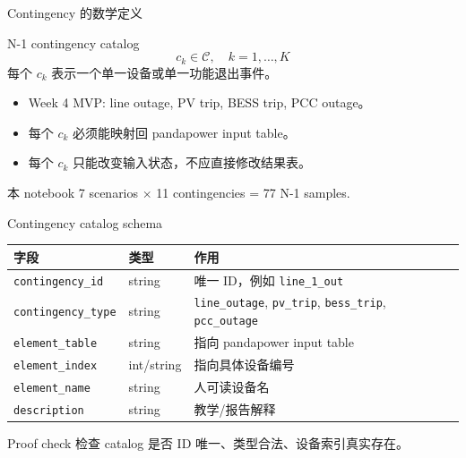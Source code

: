 \documentclass[aspectratio=169,11pt]{beamer}
\begin{document}
\begin{frame}{Contingency 的数学定义}
\begin{block}{N-1 contingency catalog}
\[
c_k \in \mathcal{C},\quad k=1,\ldots,K
\]
每个 $c_k$ 表示一个单一设备或单一功能退出事件。
\end{block}
\begin{itemize}
  \item Week 4 MVP: line outage, PV trip, BESS trip, PCC outage。
  \item 每个 $c_k$ 必须能映射回 pandapower input table。
  \item 每个 $c_k$ 只能改变输入状态，不应直接修改结果表。
\end{itemize}
\begin{exampleblock}{本 notebook}
7 scenarios $\times$ 11 contingencies = 77 N-1 samples.
\end{exampleblock}
\end{frame}

\begin{frame}{Contingency catalog schema}
\scriptsize
\begin{tabular}{llp{6.2cm}}
\toprule
字段 & 类型 & 作用 \\
\midrule
\texttt{contingency\_id} & string & 唯一 ID，例如 \texttt{line\_1\_out} \\
\texttt{contingency\_type} & string & \texttt{line\_outage}, \texttt{pv\_trip}, \texttt{bess\_trip}, \texttt{pcc\_outage} \\
\texttt{element\_table} & string & 指向 pandapower input table \\
\texttt{element\_index} & int/string & 指向具体设备编号 \\
\texttt{element\_name} & string & 人可读设备名 \\
\texttt{description} & string & 教学/报告解释 \\
\bottomrule
\end{tabular}
\vspace{0.3cm}

\begin{block}{Proof check}
检查 catalog 是否 ID 唯一、类型合法、设备索引真实存在。
\end{block}
\end{frame}
\end{document}
